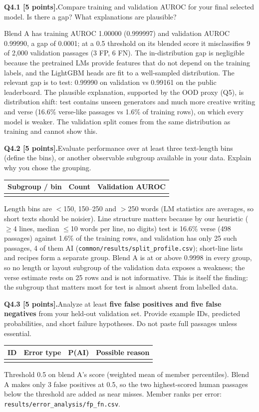 \documentclass[11pt,letterpaper]{article}
\newcommand{\question}[2]{\needspace{4\baselineskip}\par\addvspace{0.45em}\noindent\textbf{#1}\quad #2\par\nobreak\vspace{0.1em}}
\newcommand{\smallnote}[1]{{\small\color{muted}#1}}
\begin{document}
\question{Q4.1 [5 points].}{Compare training and validation AUROC for your final selected model. Is there a gap? What explanations are plausible?}
Blend A has training AUROC 1.00000 (0.999997) and validation AUROC 0.99990, a gap of 0.0001; at a 0.5 threshold on its blended score it misclassifies 9 of 2,000 validation passages (3 FP, 6 FN). The in-distribution gap is negligible because the pretrained LMs provide features that do not depend on the training labels, and the LightGBM heads are fit to a well-sampled distribution. The relevant gap is to test: 0.99990 on validation vs 0.99161 on the public leaderboard. The plausible explanation, supported by the OOD proxy (Q5), is distribution shift: test contains unseen generators and much more creative writing and verse (16.6\% verse-like passages vs 1.6\% of training rows), on which every model is weaker. The validation split comes from the same distribution as training and cannot show this.

\question{Q4.2 [5 points].}{Evaluate performance over at least three text-length bins (define the bins), or another observable subgroup available in your data. Explain why you chose the grouping.}
\begin{tabularx}{\linewidth}{@{}Yrr@{}}\toprule Subgroup / bin & Count & Validation AUROC \\ \midrule
{}
\bottomrule\end{tabularx}
Length bins are $<$150, 150--250 and $>$250 words (LM statistics are averages, so short texts should be noisier). Line structure matters because by our heuristic ($\ge$4 lines, median $\le$10 words per line, no digits) test is 16.6\% verse (498 passages) against 1.6\% of the training rows, and validation has only 25 such passages, 4 of them AI (\texttt{common/results/split\_profile.csv}); short-line lists and recipes form a separate group. Blend A is at or above 0.9998 in every group, so no length or layout subgroup of the validation data exposes a weakness; the verse estimate rests on 25 rows and is not informative. This is itself the finding: the subgroup that matters most for test is almost absent from labelled data.

\question{Q4.3 [5 points].}{Analyze at least \textbf{five false positives and five false negatives} from your held-out validation set. Provide example IDs, predicted probabilities, and short failure hypotheses. Do not paste full passages unless essential.}
{\small\begin{tabularx}{\linewidth}{@{}p{0.5in}p{0.82in}p{0.42in}Y@{}}\toprule ID & Error type & P(AI) & Possible reason \\ \midrule
{}
\bottomrule\end{tabularx}}
\smallnote{Threshold 0.5 on blend A's score (weighted mean of member percentiles). Blend A makes only 3 false positives at 0.5, so the two highest-scored human passages below the threshold are added as near misses. Member ranks per error: \texttt{results/error\_analysis/fp\_fn.csv}.}
\end{document}
